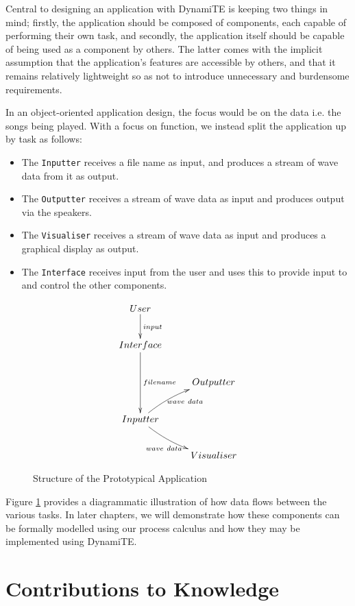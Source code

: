 Central to designing an application with DynamiTE is keeping two
things in mind; firstly, the application should be composed of
components, each capable of performing their own task, and secondly,
the application itself should be capable of being used as a component
by others.  The latter comes with the implicit assumption that the
application's features are accessible by others, and that it remains
relatively lightweight so as not to introduce unnecessary and
burdensome requirements.

In an object-oriented application design, the focus would be on the
data i.e. the songs being played.  With a focus on function, we
instead split the application up by task as follows:

\begin{itemize}
\item The \texttt{Inputter} receives a file name as input, and
  produces a stream of wave data from it as output.
\item The \texttt{Outputter} receives a stream of wave data as input
  and produces output via the speakers.
\item The \texttt{Visualiser} receives a stream of wave data as input
  and produces a graphical display as output.
\item The \texttt{Interface} receives input from the user and uses
  this to provide input to and control the other components.
\end{itemize}

\begin{figure}  
  \centering
\[\CompileMatrices
\xymatrix{
User \ar@{->}[d]^{input} \\
Interface \ar@{->}[dd]^{filename} \\ 
& Outputter \\
Inputter \ar@/^/[ur]_{wave\ data} \ar@/_/[dr]_{wave\ data} \\
& Visualiser
}
\]
  \caption{Structure of the Prototypical Application}
  \label{fig:appstructure}
\end{figure}

Figure \ref{fig:appstructure} provides a diagrammatic illustration of
how data flows between the various tasks.  In later chapters, we will
demonstrate how these components can be formally modelled using our
process calculus and how they may be implemented using DynamiTE.

\section{Contributions to Knowledge}
\label{contributions}

